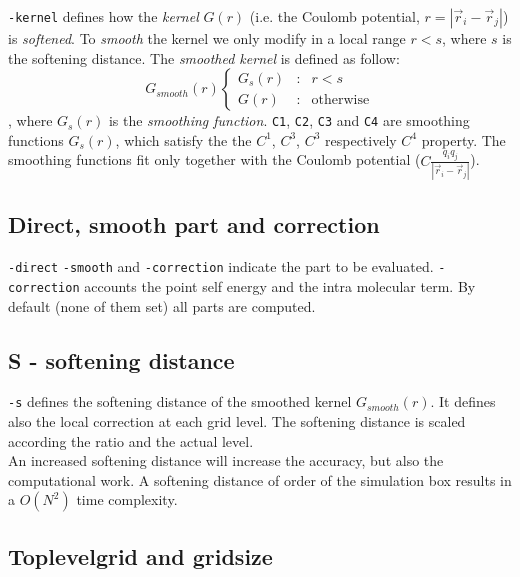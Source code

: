 \documentclass[11pt]{article}
\begin{document}
\texttt{-kernel} defines how the {\it kernel} $G(r)$ (i.e. the Coulomb
potential, $r=|\vec{r}_{i} - \vec{r}_{j}|$)  is
{\it softened}. To {\it smooth} the kernel we only modify in a local range
$r<s$, where $s$ is the softening
distance. The {\it smoothed kernel} is defined as follow:
\begin{equation}
  G_{smooth}(r) \left\{
 \begin{array}{lcl}
  G_s(r) & : & r<s\\
  G(r)   & : & \mbox{otherwise}
 \end{array}
\right.
\end{equation}
, where $G_s(r)$ is the {\it smoothing function}. \texttt{C1},
\texttt{C2},  \texttt{C3} and  \texttt{C4} are smoothing functions
$G_s(r)$, which satisfy the the $C^1$, $C^3$, $C^3$ respectively
$C^4$ property. The smoothing  functions fit
only together with the Coulomb potential ($C\frac{q_i
  q_j}{|\vec{r}_{i} - \vec{r}_{j}|}$).

\subsection{Direct, smooth part and correction}

\texttt{-direct} \texttt{-smooth} and \texttt{-correction} indicate the part to be
 evaluated. \texttt{-correction} accounts the point self energy and the
 intra molecular term. By default (none of them set) all parts are computed. 


\subsection{S - softening distance}

\texttt{-s} defines the softening distance of the smoothed kernel
$G_{smooth}(r)$. It defines also the local correction at
each grid level. The softening distance is scaled according the ratio
and the actual level.
\\
An increased softening distance will increase the accuracy, but also
the computational work. A softening distance of order of the simulation
box results in a $O(N^2)$ time complexity. 

\subsection{Toplevelgrid and gridsize}
\end{document}
